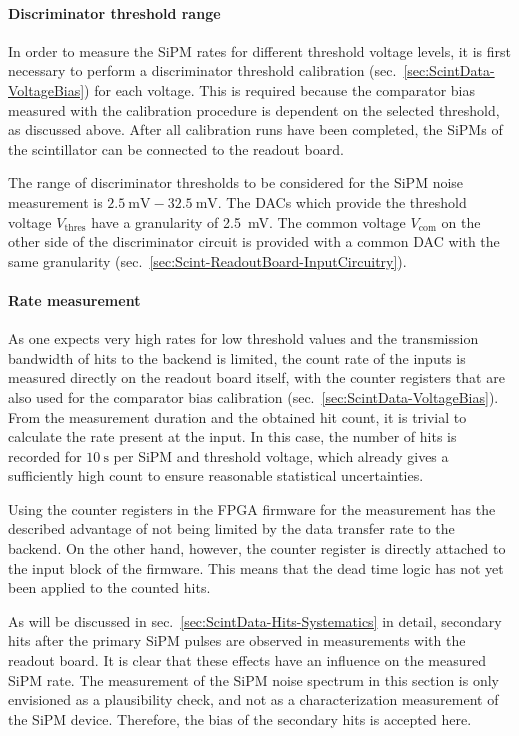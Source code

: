 \paragraph{Discriminator threshold range}
In order to measure the \ac{SiPM} rates for different threshold voltage levels, it is first necessary to perform a discriminator threshold calibration (sec.\ \ref{sec:ScintData-VoltageBias}) for each voltage. This is required because the comparator bias measured with the calibration procedure is dependent on the selected threshold, as discussed above. After all calibration runs have been completed, the \acp{SiPM} of the scintillator can be connected to the readout board.
\par The range of discriminator thresholds to be considered for the \ac{SiPM} noise measurement is $\SI{2.5}{\milli\volt}-\SI{32.5}{\milli\volt}$. The \acp{DAC} which provide the threshold voltage $V_\text{thres}$ have a granularity of \SI{2.5}{\milli\volt}. The common voltage $V_\text{com}$ on the other side of the discriminator circuit is provided with a common \ac{DAC} with the same granularity (sec.\ \ref{sec:Scint-ReadoutBoard-InputCircuitry}).
\paragraph{Rate measurement}
As one expects very high rates for low threshold values and the transmission bandwidth of hits to the backend is limited, the count rate of the inputs is measured directly on the readout board itself, with the counter registers that are also used for the comparator bias calibration (sec.\ \ref{sec:ScintData-VoltageBias}). From the measurement duration and the obtained hit count, it is trivial to calculate the rate present at the input. In this case, the number of hits is recorded for $\SI{10}{\second}$ per \ac{SiPM} and threshold voltage, which already gives a sufficiently high count to ensure reasonable statistical uncertainties.
\par Using the counter registers in the \ac{FPGA} firmware for the measurement has the described advantage of not being limited by the data transfer rate to the backend. On the other hand, however, the counter register is directly attached to the input block of the firmware. This means that the dead time logic has not yet been applied to the counted hits.
\par As will be discussed in sec.\ \ref{sec:ScintData-Hits-Systematics} in detail, secondary hits after the primary \ac{SiPM} pulses are observed in measurements with the readout board. It is clear that these effects have an influence on the measured \ac{SiPM} rate. The measurement of the \ac{SiPM} noise spectrum in this section is only envisioned as a plausibility check, and not as a characterization measurement of the \ac{SiPM} device. Therefore, the bias of the secondary hits is accepted here.
